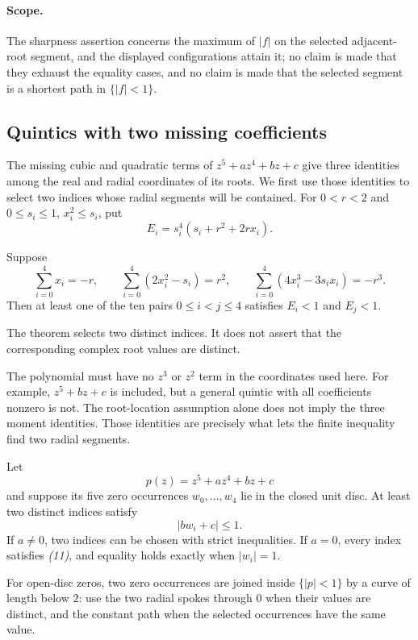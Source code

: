 \documentclass[11pt]{article}
\begin{document}
\paragraph{Scope.}
\label{rem:sharp-collinear-formal-boundary}
The sharpness assertion concerns the maximum of $|f|$ on the selected adjacent-root
segment, and the displayed configurations attain it; no claim is made that
they exhaust the equality cases, and no claim is made that the selected
segment is a shortest path in $\{|f|<1\}$.

\subsection{Quintics with two missing coefficients}
\label{subsec:primitive-sparse-quintic}

The missing cubic and quadratic terms of $z^5+az^4+bz+c$ give three
identities among the real and radial coordinates of its roots. We first
use those identities to select two indices whose radial segments will
be contained. For $0<r<2$ and $0\le s_i\le1$, $x_i^2\le s_i$, put
\[
 E_i=s_i^4(s_i+r^2+2rx_i).
\]

\begin{theorem}
\label{prop:primitive-quintic-two-tail-energy-selector}
Suppose
\[
 \sum_{i=0}^4x_i=-r,\qquad
 \sum_{i=0}^4(2x_i^2-s_i)=r^2,\qquad
 \sum_{i=0}^4(4x_i^3-3s_ix_i)=-r^3.              \tag{10}
\]
Then at least one of the ten pairs $0\le i<j\le4$ satisfies
$E_i<1$ and $E_j<1$.
\end{theorem}

The theorem selects two distinct indices.  It does not assert that the
corresponding complex root values are distinct.

The polynomial must have no $z^3$ or $z^2$ term in the coordinates used
here. For example, $z^5+bz+c$ is included, but a general quintic with all
coefficients nonzero is not. The root-location assumption alone does not
imply the three moment identities. Those identities are precisely what
lets the finite inequality find two radial segments.

\begin{theorem}
\label{thm:primitive-quintic-two-tail}
Let
\[
 p(z)=z^5+az^4+bz+c
\]
and suppose its five zero occurrences $w_0,\ldots,w_4$ lie in the closed unit
disc.  At least two distinct indices satisfy
\[
 |bw_i+c|\le1.                                    \tag{11}
\]
If $a\ne0$, two indices can be chosen with strict inequalities.  If $a=0$,
every index satisfies \emph{(11)}, and equality holds exactly when
$|w_i|=1$.

For open-disc zeros, two zero occurrences are joined inside $\{|p|<1\}$ by a
curve of length below $2$: use the two radial spokes through $0$ when their
values are distinct, and the constant path when the selected occurrences
have the same value.
\end{theorem}
\end{document}
